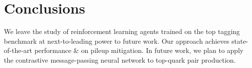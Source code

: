 \section{Conclusions}\label{sec:conclusions}

We leave the study of reinforcement learning agents trained on the top
tagging benchmark at next-to-leading power to future work. Our approach
achieves state-of-the-art performance & on pileup mitigation. In future
work, we plan to apply the contrastive message-passing neural network to
top-quark pair production.

